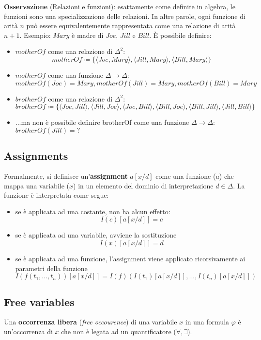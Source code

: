 \textbf{Osservazione} (Relazioni e funzioni): esattamente come definite in algebra, le funzioni sono una specializzazione delle relazioni. In altre parole, ogni funzione di arità $n$ può essere equivalentemente rappresentata come una relazione di arità $n+1$. Esempio: $Mary$ è madre di $Joe$, $Jill$ e $Bill$. È possibile definire:
\begin{itemize}
\item $motherOf$ come una relazione di $\Delta^2$: $$motherOf \coloneqq \lbrace \langle Joe, Mary \rangle, \langle Jill, Mary \rangle, \langle Bill, Mary \rangle \rbrace$$
\item $motherOf$ come una funzione $\Delta \to \Delta$: $$motherOf(Joe) = Mary, motherOf(Jill) = Mary, motherOf(Bill) = Mary$$
\item $brotherOf$ come una relazione di $\Delta^2$: $$brotherOf \coloneqq \lbrace \langle Joe, Jill \rangle, \langle Jill, Joe \rangle, \langle Joe, Bill \rangle , \langle Bill, Joe \rangle, \langle Bill, Jill \rangle, \langle Jill, Bill \rangle \rbrace$$
\item ...ma non è possibile definire brotherOf come una funzione $\Delta \to \Delta$: $brotherOf(Jill) = ?$
\end{itemize}

\subsection{Assignments}
Formalmente, si definisce un'\textbf{assignment} $a[x/d]$ come una funzione ($a$) che mappa una variabile ($x$) in un elemento del dominio di interpretazione $d \in \Delta$. La funzione è interpretata come segue:
\begin{itemize}
\item se è applicata ad una costante, non ha alcun effetto: $$I(c)[a[x/d]] = c$$
\item se è applicata ad una variabile, avviene la sostituzione $$I(x)[a[x/d]] = d$$
\item se è applicata ad una funzione, l'assignment viene applicato ricorsivamente ai parametri della funzione $$I(f(t_1, ..., t_n))[a[x/d]] = I(f)(I(t_1)[a[x/d]], ..., I(t_n)[a[x/d]])$$
\end{itemize}

\subsection{Free variables}
Una \textbf{occorrenza libera} (\textit{free occourence}) di una variabile $x$ in una formula $\varphi$ è un'occorrenza di $x$ che non è legata ad un quantificatore ($\forall, \exists$).
\\

